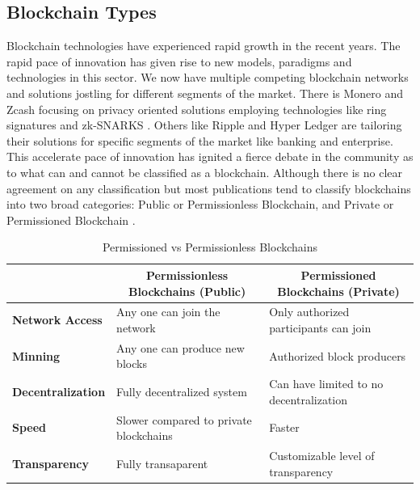 \subsection{Blockchain Types}
Blockchain technologies have experienced rapid growth in the recent years. The rapid pace of innovation has given rise to new models, paradigms and technologies in this sector. We now have multiple competing blockchain networks and solutions jostling for different segments of the market. There is Monero and Zcash focusing on privacy oriented solutions employing technologies like ring signatures \cite{paper:008} and zk-SNARKS \cite{misc:019}. Others like Ripple and Hyper Ledger are tailoring their solutions for specific segments of the market like banking and enterprise. This accelerate pace of innovation has ignited a fierce debate in the community as to what can and cannot be classified as a blockchain. Although there is no clear agreement on any classification but most publications tend to classify blockchains into two broad categories: Public or Permissionless Blockchain, and Private or Permissioned Blockchain \cite{misc:017}.
\vspace{5cm}
\begin{table}[h]
\begin{tabular}{|l|l|l|}
\hline
                          & \multicolumn{1}{c|}{\textbf{Permissionless Blockchains (Public)}} & \multicolumn{1}{c|}{\textbf{Permissioned Blockchains (Private)}} \\ \hline
\textbf{Network Access}   & Any one can join the network                                      & Only authorized participants can join                            \\ \hline
\textbf{Minning}          & Any one can produce new blocks                                    & Authorized block producers                                       \\ \hline
\textbf{Decentralization} & Fully decentralized system                                        & Can have limited to no decentralization                          \\ \hline
\textbf{Speed}            & Slower compared to private blockchains                            & Faster                                                           \\ \hline
\textbf{Transparency}     & Fully transaparent                                                & Customizable level of transparency                               \\ \hline
\end{tabular}
\caption {Permissioned vs Permissionless Blockchains}
\end{table}
\clearpage  

